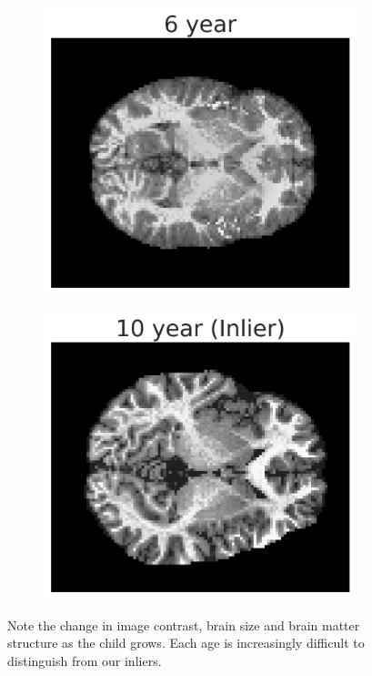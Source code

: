 \begin{figure}[tbhp]
\begin{subfigure}[b]{0.22\textwidth}
    \label{fig:brain_2}
\end{subfigure}
\begin{subfigure}[b]{0.22\textwidth}
    \includegraphics[width=\textwidth]{figures/6_year.png}
    \label{fig:brain_3}
\end{subfigure}
\begin{subfigure}[b]{0.22\textwidth}
    \includegraphics[width=\textwidth]{figures/10_year_lab.png}
    \label{fig:brain_4}
\end{subfigure}

\caption{Note the change in image contrast, brain size and brain matter structure as the child grows. Each age is increasingly difficult to distinguish from our inliers.}
\label{fig:brain_plots}
\end{figure}

